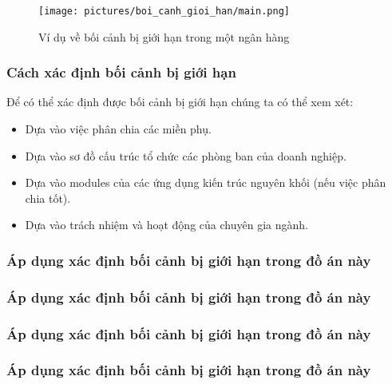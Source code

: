 \begin{figure}[H]

\centering

\texttt{[image: pictures/boi\_canh\_gioi\_han/main.png]}

\caption{Ví dụ về bối cảnh bị giới hạn trong một ngân hàng}

\end{figure}

\subsubsection{Cách xác định bối cảnh bị giới hạn}

Để có thể xác định được bối cảnh bị giới hạn chúng ta có thể xem xét:

\begin{itemize}

\item Dựa vào việc phân chia các miền phụ.

\item Dựa vào sơ đồ cấu trúc tổ chức các phòng ban của doanh nghiệp.

\item Dựa vào modules của các ứng dụng kiến trúc nguyên khối (nếu việc phân chia tốt).

\item Dựa vào trách nhiệm và hoạt động của chuyên gia ngành.

\end{itemize}

\subsubsection{Áp dụng xác định bối cảnh bị giới hạn trong đồ án này}

\subsubsection{Áp dụng xác định bối cảnh bị giới hạn trong đồ án này}

\subsubsection{Áp dụng xác định bối cảnh bị giới hạn trong đồ án này}

\subsubsection{Áp dụng xác định bối cảnh bị giới hạn trong đồ án này}

